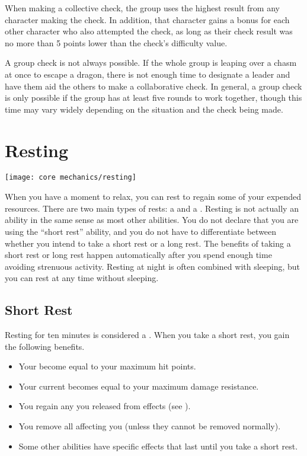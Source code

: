         When making a collective check, the group uses the highest result from any character making the check.
        In addition, that character gains a  bonus for each other character who also attempted the check, as long as their check result was no more than 5 points lower than the check's difficulty value.

         A group check is not always possible. If the whole group is leaping over a chasm at once to escape a dragon, there is not enough time to designate a leader and have them aid the others to make a collaborative check. In general, a group check is only possible if the group has at least five rounds to work together, though this time may vary widely depending on the situation and the check being made.

\section{Resting}\label{Resting}
    \texttt{[image: core mechanics/resting]}

    When you have a moment to relax, you can rest to regain some of your expended resources.
    There are two main types of rests: a  and a .
    Resting is not actually an ability in the same sense as most other abilities.
    You do not declare that you are using the ``short rest'' ability, and you do not have to differentiate between whether you intend to take a short rest or a long rest.
    The benefits of taking a short rest or long rest happen automatically after you spend enough time avoiding strenuous activity.
    Resting at night is often combined with sleeping, but you can rest at any time without sleeping.


    \subsection{Short Rest}\label{Short Rest}
        Resting for ten minutes is considered a .
        When you take a short rest, you gain the following benefits.
        \begin{itemize}
            \item Your  become equal to your maximum hit points.
            \item Your current  becomes equal to your maximum damage resistance.
            \item You regain any  you released from  effects (see ).
            \item You remove all  affecting you (unless they cannot be removed normally).
            \item Some other abilities have specific effects that last until you take a short rest.
        \end{itemize}

